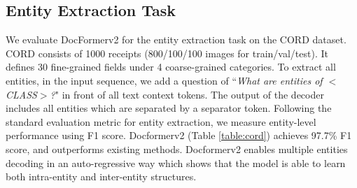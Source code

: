 \documentclass[10pt,twocolumn,letterpaper]{article}
\begin{document}
\subsection{Entity Extraction Task}
We evaluate DocFormerv2 for the entity extraction task on the CORD dataset.
CORD \cite{park2019cord} consists of 1000 receipts (800/100/100 images for train/val/test). It defines 30 fine-grained fields under 4 coarse-grained categories. To extract all entities, in the input sequence, we add a question of ``{\em What are entities of $<$CLASS$>$?}" in front of all text context tokens. The output of the decoder includes all entities which are separated by a separator token. Following the standard evaluation metric for entity extraction, we measure entity-level performance using F1 score.
Docformerv2 (Table \ref{table:cord}) achieves 97.7\% F1 score, and outperforms existing methods. Docformerv2 enables multiple entities decoding in an auto-regressive way which shows that the model is able to learn both intra-entity and inter-entity structures.
\end{document}
